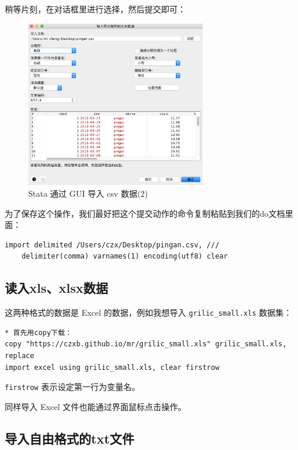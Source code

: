 稍等片刻，在对话框里进行选择，然后提交即可：

\begin{figure}[htbp]
  \centering \includegraphics[width=0.7\textwidth]{assets/csvgui2.png}
  \caption{Stata 通过 GUI 导入 csv 数据(2)}
  \label{fig:csvgui2}
\end{figure}

为了保存这个操作，我们最好把这个提交动作的命令复制粘贴到我们的do文档里面：

\begin{lstlisting}
import delimited /Users/czx/Desktop/pingan.csv, ///
    delimiter(comma) varnames(1) encoding(utf8) clear
\end{lstlisting}

\subsection{读入xls、xlsx数据}

这两种格式的数据是 Excel 的数据，例如我想导入 \texttt{grilic\_small.xls} 数据集：

\begin{lstlisting}
* 首先用copy下载：
copy "https://czxb.github.io/mr/grilic_small.xls" grilic_small.xls, replace
import excel using grilic_small.xls, clear firstrow
\end{lstlisting}

\texttt{firstrow} 表示设定第一行为变量名。

同样导入 Excel 文件也能通过界面鼠标点击操作。

\subsection{导入自由格式的txt文件}


